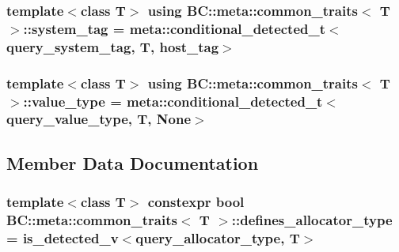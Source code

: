\subsubsection[{\texorpdfstring{system\+\_\+tag}{system_tag}}]{\setlength{\rightskip}{0pt plus 5cm}template$<$class T$>$ using {\bf B\+C\+::meta\+::common\+\_\+traits}$<$ T $>$\+::{\bf system\+\_\+tag} =  {\bf meta\+::conditional\+\_\+detected\+\_\+t}$<${\bf query\+\_\+system\+\_\+tag}, T, {\bf host\+\_\+tag}$>$}\hypertarget{structBC_1_1meta_1_1common__traits_ac0343c0340c4ac5bec82d0ba7248038d}{}\label{structBC_1_1meta_1_1common__traits_ac0343c0340c4ac5bec82d0ba7248038d}
\subsubsection[{\texorpdfstring{value\+\_\+type}{value_type}}]{\setlength{\rightskip}{0pt plus 5cm}template$<$class T$>$ using {\bf B\+C\+::meta\+::common\+\_\+traits}$<$ T $>$\+::{\bf value\+\_\+type} =  {\bf meta\+::conditional\+\_\+detected\+\_\+t}$<${\bf query\+\_\+value\+\_\+type}, T, None$>$}\hypertarget{structBC_1_1meta_1_1common__traits_ad71b54002cc60a73cd2c67226b7cb98a}{}\label{structBC_1_1meta_1_1common__traits_ad71b54002cc60a73cd2c67226b7cb98a}


\subsection{Member Data Documentation}
\subsubsection[{\texorpdfstring{defines\+\_\+allocator\+\_\+type}{defines_allocator_type}}]{\setlength{\rightskip}{0pt plus 5cm}template$<$class T$>$ constexpr bool {\bf B\+C\+::meta\+::common\+\_\+traits}$<$ T $>$\+::defines\+\_\+allocator\+\_\+type = is\+\_\+detected\+\_\+v$<${\bf query\+\_\+allocator\+\_\+type}, T$>$\hspace{0.3cm}{\ttfamily [static]}}\hypertarget{structBC_1_1meta_1_1common__traits_a6b3bfa93ba666bf3be2714c15c5036da}{}\label{structBC_1_1meta_1_1common__traits_a6b3bfa93ba666bf3be2714c15c5036da}
